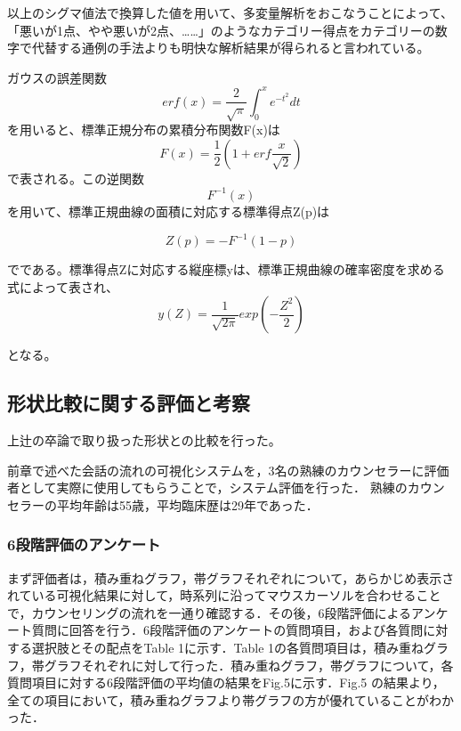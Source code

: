 \documentclass[shuuron]{kuee}
\begin{document}
以上のシグマ値法で換算した値を用いて、多変量解析をおこなうことによって、「悪いが1点、やや悪いが2点、……」のようなカテゴリー得点をカテゴリーの数字で代替する通例の手法よりも明快な解析結果が得られると言われている。

ガウスの誤差関数
\begin{equation}
  erf(x) = \frac{2}{\sqrt{\pi}}\int_0^x e^{-t^2} dt
\end{equation}
を用いると、標準正規分布の累積分布関数F(x)は
\begin{equation}
  F(x) = \frac{1}{2}(1+erf\frac{x}{\sqrt{2}})
\end{equation}
で表される。この逆関数\begin{equation}F^{-1}(x)\end{equation}を用いて、標準正規曲線の面積に対応する標準得点Z(p)は


\begin{equation}
  Z(p) = -F^{-1}(1-p)
\end{equation}

でである。標準得点Zに対応する縦座標yは、標準正規曲線の確率密度を求める式によって表され、
\begin{equation}
y(Z)=\frac{1}{\sqrt{2\pi}}exp(-\frac{Z^2}{2})
\end{equation}

となる。






\subsection{形状比較に関する評価と考察}
上辻の卒論で取り扱った形状との比較を行った。

前章で述べた会話の流れの可視化システムを，3名の熟練のカウンセラーに評価者として実際に使用してもらうことで，システム評価を行った．
熟練のカウンセラーの平均年齢は55歳，平均臨床歴は29年であった．

\subsubsection{6段階評価のアンケート}



まず評価者は，積み重ねグラフ，帯グラフそれぞれについて，あらかじめ表示されている可視化結果に対して，時系列に沿ってマウスカーソルを合わせることで，カウンセリングの流れを一通り確認する．その後，6段階評価によるアンケート質問に回答を行う．6段階評価のアンケートの質問項目，および各質問に対する選択肢とその配点をTable 1に示す．Table 1の各質問項目は，積み重ねグラフ，帯グラフそれぞれに対して行った．積み重ねグラフ，帯グラフについて，各質問項目に対する6段階評価の平均値の結果をFig.5に示す．Fig.5 の結果より，全ての項目において，積み重ねグラフより帯グラフの方が優れていることがわかった．
\end{document}
